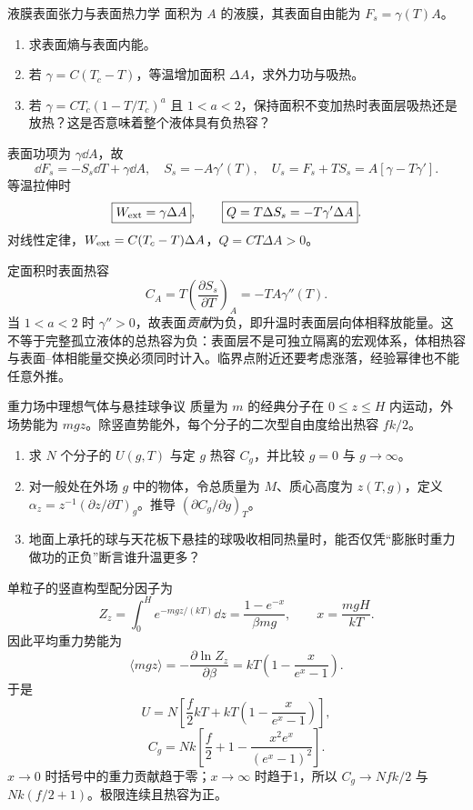 {\begin{advexamplebox}{液膜表面张力与表面热力学}\label{advA2:ex:surface-thermodynamics}
面积为 $A$ 的液膜，其表面自由能为 $F_s=\gamma(T)A$。
\begin{enumerate}
 \item 求表面熵与表面内能。
 \item 若 $\gamma=C(T_c-T)$，等温增加面积 $\Delta A$，求外力功与吸热。
 \item 若 $\gamma=CT_c(1-T/T_c)^a$ 且 $1<a<2$，保持面积不变加热时表面层吸热还是放热？这是否意味着整个液体具有负热容？
\end{enumerate}

\AQSurfaceThermo
\end{advexamplebox}
\begin{advsolution}
\AASurfaceThermo

表面功项为 $\gamma\dd A$，故
\[
 \dd F_s=-S_s\dd T+\gamma\dd A,
 \quad
 \boxed{S_s=-A\gamma'(T)},
 \quad
 \boxed{U_s=F_s+TS_s=A[\gamma-T\gamma']}.
\]
等温拉伸时
\[
 \boxed{W_{\rm ext}=\gamma\Delta A},
 \qquad
 \boxed{Q=T\Delta S_s=-T\gamma'\Delta A}.
\]
对线性定律，$W_{\rm ext}=C(T_c-T)\Delta A$，$Q=CT\Delta A>0$。

定面积时表面热容
\[
 C_A=T\left(\frac{\partial S_s}{\partial T}\right)_A
 =-TA\gamma''(T).
\]
当 $1<a<2$ 时 $\gamma''>0$，故表面\emph{贡献}为负，即升温时表面层向体相释放能量。这不等于完整孤立液体的总热容为负：表面层不是可独立隔离的宏观体系，体相热容与表面--体相能量交换必须同时计入。临界点附近还要考虑涨落，经验幂律也不能任意外推。
\end{advsolution}

\begin{advexamplebox}{重力场中理想气体与悬挂球争议}\label{advA2:ex:gravity-heat-capacity}
质量为 $m$ 的经典分子在 $0\le z\le H$ 内运动，外场势能为 $mgz$。除竖直势能外，每个分子的二次型自由度给出热容 $fk/2$。
\begin{enumerate}
 \item 求 $N$ 个分子的 $U(g,T)$ 与定 $g$ 热容 $C_g$，并比较 $g=0$ 与 $g\to\infty$。
 \item 对一般处在外场 $g$ 中的物体，令总质量为 $M$、质心高度为 $z(T,g)$，定义
 $\alpha_z=z^{-1}(\partial z/\partial T)_g$。推导 $(\partial C_g/\partial g)_T$。
 \item 地面上承托的球与天花板下悬挂的球吸收相同热量时，能否仅凭“膨胀时重力做功的正负”断言谁升温更多？
\end{enumerate}

\AQGravityHeat
\end{advexamplebox}
\begin{advsolution}
单粒子的竖直构型配分因子为
\[
 Z_z=\int_0^H e^{-mgz/(kT)}\dd z
 =\frac{1-e^{-x}}{\beta mg},
 \qquad x=\frac{mgH}{kT}.
\]
因此平均重力势能为
\[
 \langle mgz\rangle=-\frac{\partial\ln Z_z}{\partial\beta}
 =kT\left(1-\frac{x}{e^x-1}\right).
\]
于是
\[
 \boxed{U=N\left[\frac f2kT+kT\left(1-\frac{x}{e^x-1}\right)\right]},
\]
\[
 \boxed{C_g=Nk\left[\frac f2+1-\frac{x^2e^x}{(e^x-1)^2}\right]}.
\]
$x\to0$ 时括号中的重力贡献趋于零；$x\to\infty$ 时趋于1，所以
$C_g\to Nfk/2$ 与 $Nk(f/2+1)$。极限连续且热容为正。


\end{advsolution}}
